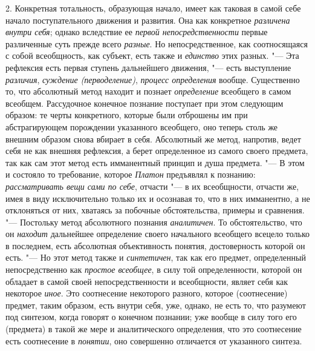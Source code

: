 2. Конкретная тотальность, образующая начало, имеет как
таковая в самой себе начало поступательного движения и развития. Она как
конкретное {\em различена внутри себя};
однако вследствие ее {\em первой непосредственности}
первые различенные суть прежде всего {\em разные}. Но
непосредственное, как соотносящаяся с собой всеобщность, как субъект, есть
также и {\em единство} этих разных. "--- Эта рефлексия есть первая
ступень дальнейшего движения, "--- есть выступление
{\em различия}, {\em суждение (перводеление)}, {\em процесс определения}
вообще. Существенно то, что абсолютный метод находит и
познает {\em определение}
всеобщего в самом всеобщем. Рассудочное конечное познание
поступает при этом следующим образом: те черты конкретного, которые были
отброшены им при абстрагирующем порождении указанного всеобщего, оно теперь
столь же внешним образом снова вбирает в себя. Абсолютный же метод,
напротив, ведет себя не как внешняя рефлексия, а берет определенное из
самого своего предмета, так как сам этот метод есть имманентный принцип и
душа предмета. "--- В этом и состояло то
требование, которое {\em Платон}
предъявлял к познанию:
{\em рассматривать вещи сами по себе},
отчасти "--- в их всеобщности, отчасти же, имея в
виду исключительно только их и осознавая то, что в них имманентно, а не
отклоняться от них, хватаясь за побочные обстоятельства, примеры и
сравнения. "--- Постольку метод абсолютного познания
{\em аналитичен}. То
обстоятельство, что он {\em находит}
дальнейшее определение своего начального всеобщего всецело
только в последнем, есть абсолютная объективность понятия, достоверность
которой он есть. "--- \label{bkm:bmpg224a}Но этот метод также и
{\em синтетичен}, так как
его предмет, определенный непосредственно как {\em простое всеобщее}, в
силу той определенности, которой он обладает в самой своей
непосредственности и всеобщности, являет себя как некоторое
{\em иное}. Это
соотнесение некоторого разного, которое (соотнесение) предмет, таким
образом, есть внутри себя, уже, однако, не есть то, что разумеют под
синтезом, когда говорят о конечном познании; уже вообще в силу того его
(предмета) в такой же мере и аналитического определения, что это
соотнесение есть соотнесение в {\em понятии}, оно
совершенно отличается от указанного синтеза.

